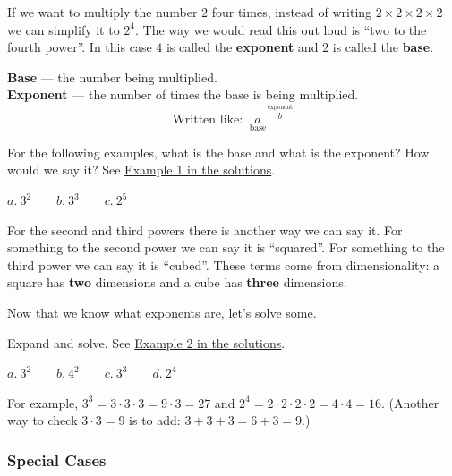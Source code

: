 \documentclass[letter]{article}
\newenvironment{keybox}
  {\begin{lrbox}{\keyboxsave}\begin{minipage}{\dimexpr\linewidth-2\fboxsep-2\fboxrule\relax}}
  {\end{minipage}\end{lrbox}\par\noindent\fbox{\usebox{\keyboxsave}}\par}
\newcommand{\exbox}[1]{\fbox{\textbf{Example #1}}}
\newcommand{\chp}{}
\newcommand{\seesol}[1]{See \hyperref[sec:\chp ex#1]{Example #1 in the solutions}.}
\begin{document}
If we want to multiply the number $2$ four times, instead of writing $2\times2\times2\times2$ we can simplify it to $2^4$. The way we would read this out loud is ``two to the fourth power''. In this case $4$ is called the \textbf{exponent} and $2$ is called the \textbf{base}.

\begin{keybox}
\textbf{Base} --- the number being multiplied.\\
\textbf{Exponent} --- the number of times the base is being multiplied.
\[\text{Written like: }\ \underset{\text{base}}{a}\!{}^{\,\overset{\text{exponent}}{b}}\]
\end{keybox}

\exbox{1} For the following examples, what is the base and what is the exponent? How would we say it? \seesol{1}
\begin{center}
$a.\ 3^2\qquad b.\ 3^3\qquad c.\ 2^5$
\end{center}

For the second and third powers there is another way we can say it. For something to the second power we can say it is ``squared''. For something to the third power we can say it is ``cubed''. These terms come from dimensionality: a square has \textbf{two} dimensions and a cube has \textbf{three} dimensions.

\begin{center}
\qquad\qquad
{}
\end{center}

Now that we know what exponents are, let's solve some.

\exbox{2} Expand and solve. \seesol{2}
\begin{center}
$a.\ 3^2\qquad b.\ 4^2\qquad c.\ 3^3\qquad d.\ 2^4$
\end{center}
For example, $3^3=3\cdot3\cdot3=9\cdot3=27$ and $2^4=2\cdot2\cdot2\cdot2=4\cdot4=16$. (Another way to check $3\cdot3=9$ is to add: $3+3+3=6+3=9$.)

\subsubsection*{Special Cases}
\end{document}
